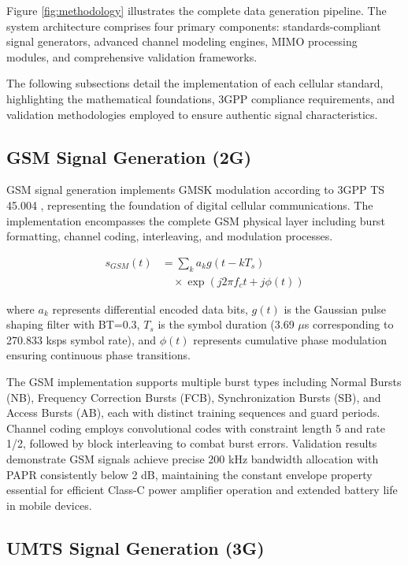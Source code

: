 \documentclass[twocolumn]{article}
\begin{document}
Figure \ref{fig:methodology} illustrates the complete data generation pipeline. The system architecture comprises four primary components: standards-compliant signal generators, advanced channel modeling engines, MIMO processing modules, and comprehensive validation frameworks.

The following subsections detail the implementation of each cellular standard, highlighting the mathematical foundations, 3GPP compliance requirements, and validation methodologies employed to ensure authentic signal characteristics.

\subsection{GSM Signal Generation (2G)}

GSM signal generation implements GMSK modulation according to 3GPP TS 45.004 \cite{3gpp2018ts45004}, representing the foundation of digital cellular communications. The implementation encompasses the complete GSM physical layer including burst formatting, channel coding, interleaving, and modulation processes.

\begin{align}
s_{GSM}(t) &= \sum_{k} a_k g(t-kT_s) \nonumber \\
&\quad \times \exp(j2\pi f_c t + j\phi(t))
\end{align}

where $a_k$ represents differential encoded data bits, $g(t)$ is the Gaussian pulse shaping filter with BT=0.3, $T_s$ is the symbol duration (3.69 $\mu$s corresponding to 270.833 ksps symbol rate), and $\phi(t)$ represents cumulative phase modulation ensuring continuous phase transitions.

The GSM implementation supports multiple burst types including Normal Bursts (NB), Frequency Correction Bursts (FCB), Synchronization Bursts (SB), and Access Bursts (AB), each with distinct training sequences and guard periods. Channel coding employs convolutional codes with constraint length 5 and rate 1/2, followed by block interleaving to combat burst errors. Validation results demonstrate GSM signals achieve precise 200 kHz bandwidth allocation with PAPR consistently below 2 dB, maintaining the constant envelope property essential for efficient Class-C power amplifier operation and extended battery life in mobile devices.

\subsection{UMTS Signal Generation (3G)}
\end{document}
